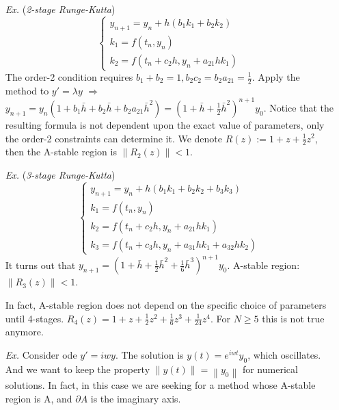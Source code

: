 \documentclass[a4paper, 11pt]{article}
\begin{document}
\begin{itemize}
	\item[\textit{Ex.}] (\emph{2-stage Runge-Kutta}) 
	\begin{equation}
		\begin{cases}
			y_{n+1} = y_n + h(b_1 k_1 + b_2 k_2) \\
			k_1 = f(t_n , y_n) \\
			k_2 = f(t_n + c_2 h , y_n + a_{21}h k_1) 
		\end{cases}
	\end{equation}
	The order-2 condition requires $b_1 + b_2 = 1, b_2c_2 = b_2 a_{21} = \frac{1}{2}$. Apply the method to $y'= \lambda y$ $\Rightarrow$ $y_{n+1} = y_n (1+b_1 \bar{h} + b_2 \bar{h} + b_2 a_{21} \bar{h}^2) = (1+\bar{h}+\frac{1}{2}\bar{h}^2)^{n+1} y_0$. Notice that the resulting formula is not dependent upon the exact value of parameters, only the order-2 constraints can determine it. We denote $R(z):= 1+z+\frac{1}{2}z^2$, then the A-stable region is $\left\|R_2(z)\right\|<1$.

	\item[\textit{Ex.}] (\emph{3-stage Runge-Kutta}) 
	\begin{equation}
		\begin{cases}
			y_{n+1} = y_n + h(b_1 k_1 + b_2 k_2 + b_3 k_3) \\
			k_1 = f(t_n , y_n) \\
			k_2 = f(t_n + c_2 h , y_n + a_{21}h k_1) \\
			k_3 = f(t_n + c_3 h , y_n + a_{31}h k_1 + a_{32}h k_2) 
		\end{cases}
	\end{equation}
	It turns out that $y_{n+1} = (1+ \bar{h} + \frac{1}{2}\bar{h}^2 + \frac{1}{6}\bar{h}^3)^{n+1} y_0$. A-stable region: $\left\|R_3(z)\right\|<1$.

	In fact, A-stable region does not depend on the specific choice of parameters until 4-stages. $R_4(z)=1+z+\frac{1}{2}z^2 + \frac{1}{6}z^3 + \frac{1}{24}z^4$. For $N\geq 5$ this is not true anymore.

	\item[\textit{Ex.}] Consider ode $y'=iwy$. The solution is $y(t)=e^{iwt} y_0$, which oscillates. And we want to keep the property $\left\|y(t)\right\| = \left\|y_0\right\|$ for numerical solutions. In fact, in this case we are seeking for a method whose A-stable region is A, and $\partial A$ is the imaginary axis.


\end{itemize}
\end{document}
